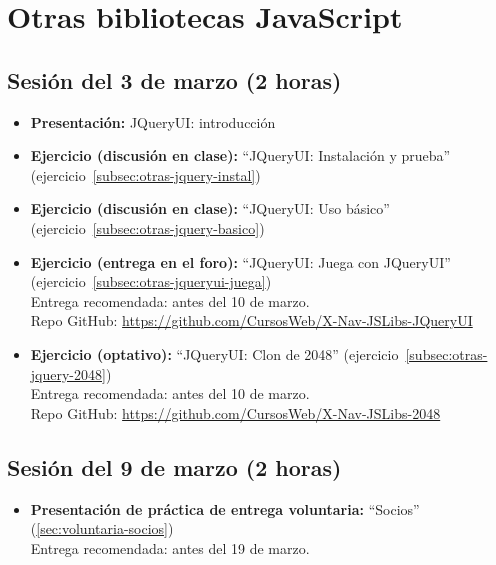 \documentclass[a4paper,12pt]{report}
\begin{document}
\section{Otras bibliotecas JavaScript}

\subsection{Sesión del 3 de marzo (2 horas)}

\begin{itemize}
\item \textbf{Presentación:} JQueryUI: introducción
\item \textbf{Ejercicio (discusión en clase):} ``JQueryUI: Instalación y prueba'' (ejercicio~\ref{subsec:otras-jquery-instal})
\item \textbf{Ejercicio (discusión en clase):} ``JQueryUI: Uso básico'' (ejercicio~\ref{subsec:otras-jquery-basico}) \\
\item \textbf{Ejercicio (entrega en el foro):} ``JQueryUI: Juega con JQueryUI'' (ejercicio~\ref{subsec:otras-jqueryui-juega}) \\
  Entrega recomendada: antes del 10 de marzo. \\
  Repo GitHub: \url{https://github.com/CursosWeb/X-Nav-JSLibs-JQueryUI}
\item \textbf{Ejercicio (optativo):} ``JQueryUI: Clon de 2048'' (ejercicio~\ref{subsec:otras-jquery-2048}) \\
  Entrega recomendada: antes del 10 de marzo. \\
  Repo GitHub: \url{https://github.com/CursosWeb/X-Nav-JSLibs-2048}
\end{itemize}

\subsection{Sesión del 9 de marzo (2 horas)}

\begin{itemize}
\item \textbf{Presentación de práctica de entrega voluntaria:} ``Socios'' (\ref{sec:voluntaria-socios}) \\
  Entrega recomendada: antes del 19 de marzo.
\end{itemize}
\end{document}
